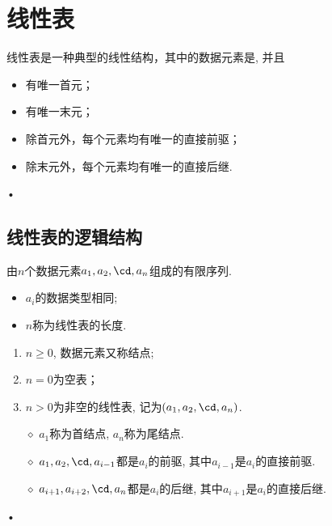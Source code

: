 \section{线性表}

\begin{frame}

  
  线性表是一种典型的线性结构，其中的数据元素是, 并且
  \begin{itemize}
  \item
    有唯一首元；
  \item
    有唯一末元；
  \item
    除首元外，每个元素均有唯一的直接前驱；
  \item
    除末元外，每个元素均有唯一的直接后继. 
  \end{itemize}•

\end{frame}


\subsection{线性表的逻辑结构}
\begin{frame}\ft{\secname}
\begin{dingyi}
由$n$个数据元素$a_1,a_2,\cd,a_n$组成的有限序列.
\begin{itemize}
\item $a_i$的数据类型相同;
\item $n$称为线性表的长度.
\end{itemize}
\end{dingyi}

\pause 
\begin{enumerate}
\item $n\ge 0$, 数据元素又称结点;
\item $n=0$为空表；\\[0.1in]
\item $n>0$为非空的线性表, 记为$(a_1,a_2,\cd,a_n)$. \\[0.1in]
\item[$\diamond$]
$a_1$称为首结点, $a_n$称为尾结点.  
\item[$\diamond$]
$a_1,a_2,\cd,a_{i-1}$都是$a_i%
$的前驱, 其中$a_{i-1}$是$a_i$的直接前驱. 
\item[$\diamond$]
$a_{i+1},a_{i+2},\cd,a_{n}$都是$a_i%
$的后继, 其中$a_{i+1}$是$a_i$的直接后继. 
\end{enumerate}•
\end{frame}


